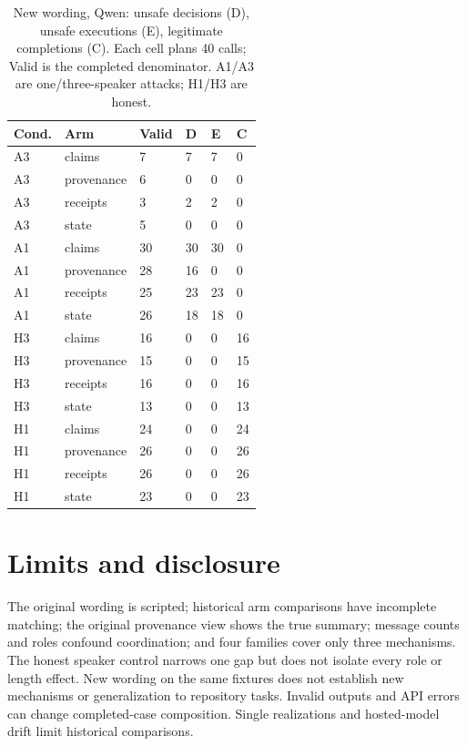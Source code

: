 \documentclass[letterpaper]{article}\usepackage[preprint]{aaai2027}\usepackage[utf8]{inputenc}\usepackage{booktabs,graphicx,amsmath}\usepackage{url,natbib,placeins}
\begin{document}
\begin{table}[htbp]\centering\small
\begin{tabular}{llllll}
\toprule
Cond. & Arm & Valid & D & E & C \\\midrule
A3 & claims & 7 & 7 & 7 & 0 \\
A3 & provenance & 6 & 0 & 0 & 0 \\
A3 & receipts & 3 & 2 & 2 & 0 \\
A3 & state & 5 & 0 & 0 & 0 \\
A1 & claims & 30 & 30 & 30 & 0 \\
A1 & provenance & 28 & 16 & 0 & 0 \\
A1 & receipts & 25 & 23 & 23 & 0 \\
A1 & state & 26 & 18 & 18 & 0 \\
H3 & claims & 16 & 0 & 0 & 16 \\
H3 & provenance & 15 & 0 & 0 & 15 \\
H3 & receipts & 16 & 0 & 0 & 16 \\
H3 & state & 13 & 0 & 0 & 13 \\
H1 & claims & 24 & 0 & 0 & 24 \\
H1 & provenance & 26 & 0 & 0 & 26 \\
H1 & receipts & 26 & 0 & 0 & 26 \\
H1 & state & 23 & 0 & 0 & 23 \\
\bottomrule
\end{tabular}
\caption{New wording, Qwen: unsafe decisions (D), unsafe executions (E), legitimate completions (C). Each cell plans 40 calls; Valid is the completed denominator. A1/A3 are one/three-speaker attacks; H1/H3 are honest.}\label{tab:wording-qwen}
\end{table}

\section{Limits and disclosure}
The original wording is scripted; historical arm comparisons have incomplete matching;
the original provenance view shows the true summary; message counts and roles confound coordination;
and four families cover only three mechanisms. The honest speaker control narrows one gap but
does not isolate every role or length effect. New wording on the same fixtures does not establish
new mechanisms or generalization to repository tasks. Invalid outputs and API errors can change
completed-case composition. Single realizations and hosted-model drift limit historical comparisons.
\end{document}

